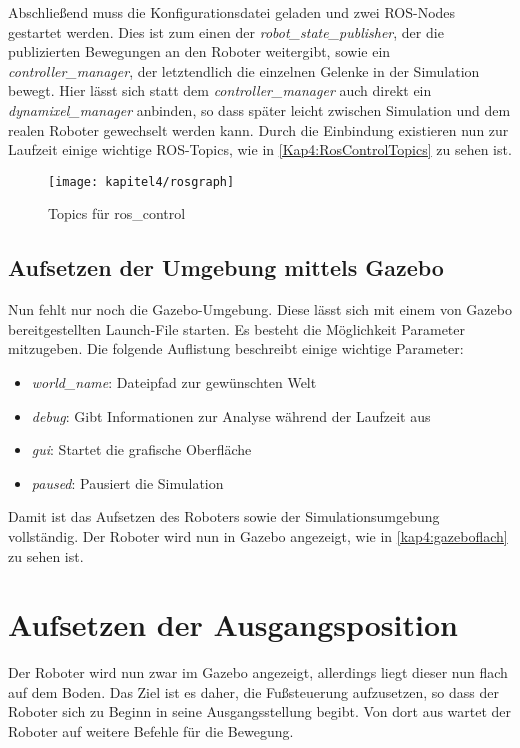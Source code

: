 Abschließend muss die Konfigurationsdatei geladen und zwei \ac{ROS}-Nodes gestartet werden. Dies ist zum einen der \textit{robot\_state\_publisher}, der die publizierten Bewegungen an den Roboter weitergibt, sowie ein \textit{controller\_manager}, der letztendlich die einzelnen Gelenke in der Simulation bewegt. Hier lässt sich statt dem \textit{controller\_manager} auch direkt ein \textit{dynamixel\_manager} anbinden, so dass später leicht zwischen Simulation und dem realen Roboter gewechselt werden kann. Durch die Einbindung existieren nun zur Laufzeit einige wichtige \ac{ROS}-Topics, wie in \autoref{Kap4:RosControlTopics} zu sehen ist.

\begin{figure}[p!]
  \centering
  \texttt{[image: kapitel4/rosgraph]}
  \caption{Topics für ros\_control}
  \label{Kap4:RosControlTopics}
\end{figure}

\subsection{Aufsetzen der Umgebung mittels Gazebo}

Nun fehlt nur noch die Gazebo-Umgebung. Diese lässt sich mit einem von Gazebo bereitgestellten Launch-File starten. Es besteht die Möglichkeit Parameter mitzugeben. Die folgende Auflistung beschreibt einige wichtige Parameter:
\begin{itemize}
  \item \textit{world\_name}: Dateipfad zur gewünschten Welt
  \item \textit{debug}: Gibt Informationen zur Analyse während der Laufzeit aus
  \item \textit{gui}: Startet die grafische Oberfläche
  \item \textit{paused}: Pausiert die Simulation
\end{itemize}

Damit ist das Aufsetzen des Roboters sowie der Simulationsumgebung vollständig. Der Roboter wird nun in Gazebo angezeigt, wie in \autoref{kap4:gazeboflach} zu sehen ist.

\section{Aufsetzen der Ausgangsposition}

Der Roboter wird nun zwar im Gazebo angezeigt, allerdings liegt dieser nun flach auf dem Boden. Das Ziel ist es daher, die Fußsteuerung aufzusetzen, so dass der Roboter sich zu Beginn in seine Ausgangsstellung begibt. Von dort aus wartet der Roboter auf weitere Befehle für die Bewegung.

